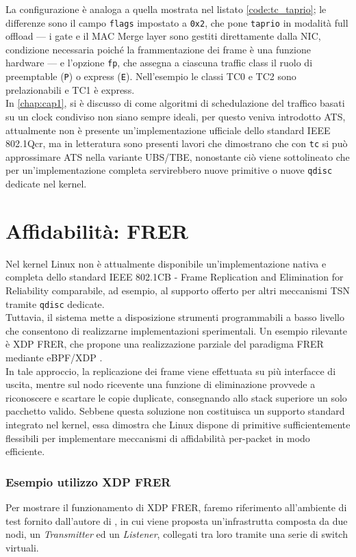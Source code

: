 \documentclass[12pt,a4paper,twoside]{book}
\begin{document}
\begin{onehalfspace}
La configurazione è analoga a quella mostrata nel listato \ref{code:tc_taprio}; le differenze sono il campo \texttt{flags} impostato a \texttt{0x2}, che pone \texttt{taprio} in modalità full offload — i gate e il MAC Merge layer sono gestiti direttamente dalla NIC, condizione necessaria poiché la frammentazione dei frame è una funzione hardware — e l'opzione \texttt{fp}, che assegna a ciascuna traffic class il ruolo di preemptable (\texttt{P}) o express (\texttt{E}). Nell'esempio le classi TC0 e TC2 sono prelazionabili e TC1 è express.
\\
In \ref{chap:cap1}, si è discusso di come algoritmi di schedulazione del traffico basati su un clock condiviso non siano sempre ideali, per questo veniva introdotto ATS, attualmente non è presente un'implementazione ufficiale dello standard IEEE 802.1Qcr, ma in letteratura sono presenti lavori \cite{ats_linux_tc} che dimostrano che con \texttt{tc} si può approssimare ATS nella variante UBS/TBE, nonostante ciò viene sottolineato che per un'implementazione completa servirebbero nuove primitive o nuove \texttt{qdisc} dedicate nel kernel.

\section{Affidabilità: FRER}
\label{sec:frer_impl}
Nel kernel Linux non è attualmente disponibile un'implementazione nativa e completa dello standard IEEE 802.1CB - Frame Replication and Elimination for Reliability comparabile, ad esempio, al supporto offerto per altri meccanismi TSN tramite \texttt{qdisc} dedicate.
\\
Tuttavia, il sistema mette a disposizione strumenti programmabili a basso livello che consentono di realizzarne implementazioni sperimentali. Un esempio rilevante è XDP FRER, che propone una realizzazione parziale del paradigma FRER mediante eBPF/XDP \cite{xdp}. 
\\
In tale approccio, la replicazione dei frame viene effettuata su più interfacce di uscita, mentre sul nodo ricevente una funzione di eliminazione provvede a riconoscere e scartare le copie duplicate, consegnando allo stack superiore un solo pacchetto valido. Sebbene questa soluzione non costituisca un supporto standard integrato nel kernel, essa dimostra che Linux dispone di primitive sufficientemente flessibili per implementare meccanismi di affidabilità per-packet in modo efficiente.

\subsubsection{Esempio utilizzo XDP FRER}
Per mostrare il funzionamento di XDP FRER, faremo riferimento all'ambiente di test fornito dall'autore di \cite{xdp}, in cui viene proposta un'infrastrutta composta da due nodi, un \textit{Transmitter} ed un \textit{Listener}, collegati tra loro tramite una serie di switch virtuali.


\end{onehalfspace}
\end{document}
